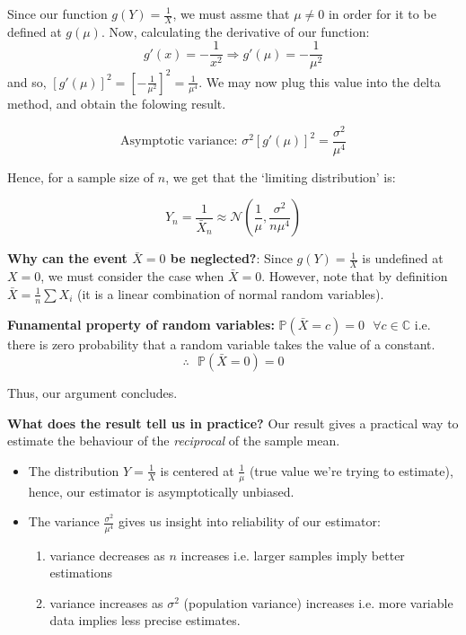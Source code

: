\vspace{0.2cm}

Since our function $g(Y)= \frac{1}{X}$, we must assme that $\mu \neq 0$ in order for it to be defined at $g(\mu)$. Now, calculating the derivative of our function:
$$g \prime (x) = - \frac{1}{x^2} \Rightarrow g \prime (\mu) = - \frac{1}{\mu^2}$$
and so, $\left[ g \prime (\mu) \right]^2 = \left[- \frac{1}{\mu^2}\right]^2 = \frac{1}{\mu^4}$. We may now plug this value into the delta method, and obtain the folowing result.

$$\text{Asymptotic variance: } \sigma^2 \left[g \prime (\mu)\right]^2 = \frac{\sigma^2}{\mu^4}$$ 

Hence, for a sample size of $n$, we get that the `limiting distribution' is:

$$Y_n = \frac{1}{\bar{X}_n} \approx \mathcal{N}\left(\frac{1}{\mu}, \frac{\sigma^2}{n \mu^4}\right)$$

\vspace{0.2cm}

\textbf{Why can the event $\bar{X}=0$ be neglected?}: Since $g(Y) = \frac{1}{X}$ is undefined at $X=0$, we must consider the case when $\bar{X}=0$. However, note that by definition 
$\bar{X}= \frac{1}{n} \sum X_i$ (it is a linear combination of normal random variables).

\vspace{0.2cm}

\begin{remark}
    \textbf{Funamental property of random variables:} $\mathbb{P}(\bar{X} = c) = 0 \text{ } \forall c \in \mathbb{C}$ i.e. there is zero probability that a random variable takes the
    value of a constant.
    $$\therefore \text{ } \mathbb{P}(\bar{X}=0)=0$$ 
\end{remark}

\vspace{0.2cm}

Thus, our argument concludes.

\vspace{0.2cm}

\textbf{What does the result tell us in practice?} Our result gives a practical way to estimate the behaviour of the \textit{reciprocal} of the sample mean.

\begin{itemize}
    \item The distribution $Y = \frac{1}{X}$ is centered at $\frac{1}{\mu}$ (true value we're trying to estimate), hence, our estimator is asymptotically unbiased.
    \item The variance $\frac{\sigma^2}{\mu^4}$ gives us insight into reliability of our estimator:
    \begin{enumerate}
        \item variance decreases as $n$ increases i.e. larger samples imply better estimations
        \item variance increases as $\sigma^2$ (population variance) increases i.e. more variable data implies less precise estimates.
    \end{enumerate}
\end{itemize}

